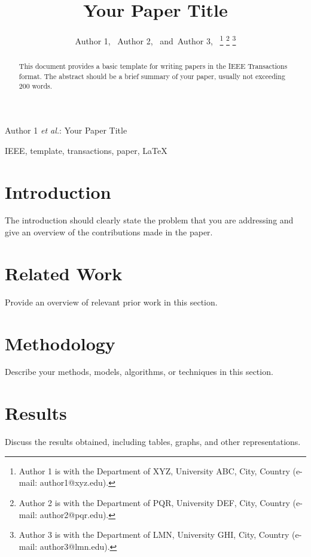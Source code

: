 \documentclass[journal]{IEEEtran}
\begin{document}
\title{Your Paper Title}

\author{Author 1,~
        Author 2,~
        and~Author 3,~%
\thanks{Author 1 is with the Department of XYZ, University ABC, City, Country (e-mail: author1@xyz.edu).}%
\thanks{Author 2 is with the Department of PQR, University DEF, City, Country (e-mail: author2@pqr.edu).}%
\thanks{Author 3 is with the Department of LMN, University GHI, City, Country (e-mail: author3@lmn.edu).}%
}

%
{Author 1 \MakeLowercase{\textit{et al.}}: Your Paper Title}

\maketitle

\begin{abstract}
This document provides a basic template for writing papers in the IEEE Transactions format. The abstract should be a brief summary of your paper, usually not exceeding 200 words.
\end{abstract}

\begin{IEEEkeywords}
IEEE, template, transactions, paper, LaTeX
\end{IEEEkeywords}

\section{Introduction}
The introduction should clearly state the problem that you are addressing and give an overview of the contributions made in the paper.

\section{Related Work}
Provide an overview of relevant prior work in this section.

\section{Methodology}
Describe your methods, models, algorithms, or techniques in this section.

\section{Results}
Discuss the results obtained, including tables, graphs, and other representations.
\end{document}
